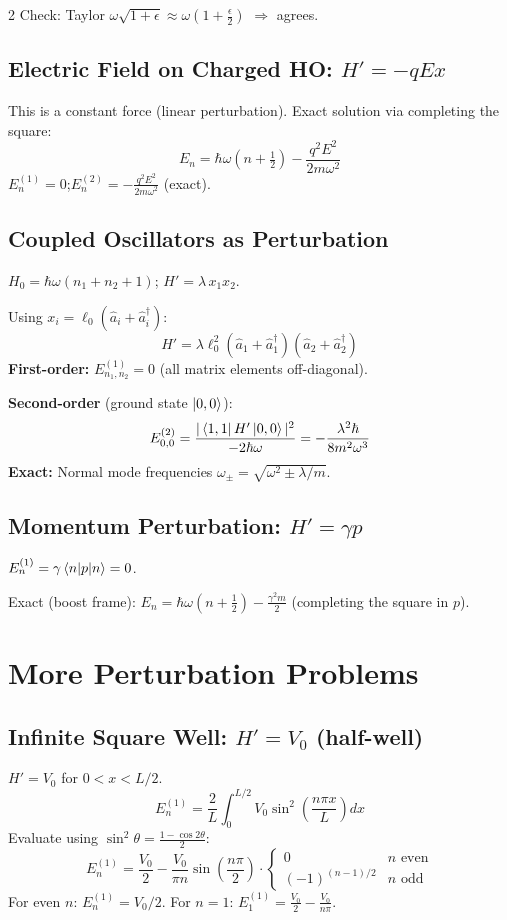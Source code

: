 \documentclass[9pt,a4paper]{article} %
\newcommand{\aop}{\hat{a}}
\newcommand{\adop}{\hat{a}^\dagger}
\begin{document}
\begin{multicols}{2}
Check: Taylor $\omega\sqrt{1+\epsilon} \approx \omega(1+\frac{\epsilon}{2})$ $\Rightarrow$ agrees.

\subsection{Electric Field on Charged HO: $H' = -qEx$}
This is a constant force (linear perturbation). Exact solution via completing the square:
\[
\boxed{E_n = \hbar\omega(n+\tfrac{1}{2}) - \frac{q^2 E^2}{2m\omega^2}}
\]
$E_n^{(1)} = 0$;\quad $E_n^{(2)} = -\frac{q^2 E^2}{2m\omega^2}$ (exact).

\subsection{Coupled Oscillators as Perturbation}
$H_0 = \hbar\omega(n_1 + n_2 + 1)$;\; $H' = \lambda\, x_1 x_2$.

Using $x_i = \ell_0(\aop_i + \adop_i)$:
\[
H' = \lambda\ell_0^2(\aop_1 + \adop_1)(\aop_2 + \adop_2)
\]
\textbf{First-order:} $E_{n_1,n_2}^{(1)} = 0$ (all matrix elements off-diagonal).

\textbf{Second-order} (ground state $\ket{0,0}$):
\[
E_{0,0}^{(2)} = \frac{|\bra{1,1}H'\ket{0,0}|^2}{-2\hbar\omega} = -\frac{\lambda^2\hbar}{8m^2\omega^3}
\]
\textbf{Exact:} Normal mode frequencies $\omega_\pm = \sqrt{\omega^2 \pm \lambda/m}$.

\subsection{Momentum Perturbation: $H' = \gamma p$}
$E_n^{(1)} = \gamma\ev{p}{n} = 0$.

Exact (boost frame): $E_n = \hbar\omega(n+\frac{1}{2}) - \frac{\gamma^2 m}{2}$ (completing the square in $p$).

\section{More Perturbation Problems}

\subsection{Infinite Square Well: $H' = V_0$ (half-well)}
$H' = V_0$ for $0<x<L/2$.
\[
E_n^{(1)} = \frac{2}{L}\int_0^{L/2} V_0 \sin^2\!\left(\frac{n\pi x}{L}\right) dx
\]
Evaluate using $\sin^2\theta = \frac{1-\cos 2\theta}{2}$:
\[
E_n^{(1)} = \frac{V_0}{2} - \frac{V_0}{\pi n}\sin\!\left(\frac{n\pi}{2}\right)\cdot\begin{cases} 0 & n\text{ even} \\ (-1)^{(n-1)/2} & n\text{ odd}\end{cases}
\]
For even $n$: $E_n^{(1)} = V_0/2$.\;
For $n=1$: $E_1^{(1)} = \frac{V_0}{2} - \frac{V_0}{n\pi}$.


\end{multicols}
\end{document}
